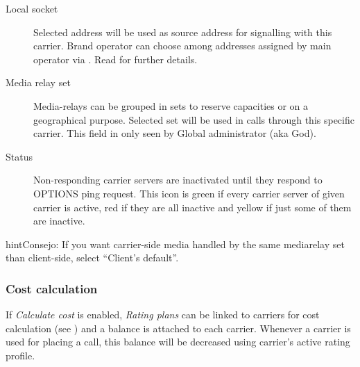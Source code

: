 \documentclass[letterpaper,10pt,spanish]{sphinxmanual}
\begin{document}
\begin{description}
\item[{Local socket}] \leavevmode{}\label{administration_portal/brand/providers/carriers:term-local-socket}
Selected address will be used as source address for signalling with this carrier. Brand operator can choose among
addresses assigned by main operator via {\hyperref[administration_portal/platform/brands:brands]{}}. Read {\hyperref[administration_portal/platform/infrastructure/proxy_trunks:proxy\string-trunks]{}} for further details.

\item[{Media relay set}] \leavevmode{}\label{administration_portal/brand/providers/carriers:term-media-relay-set}
Media-relays can be grouped in sets to reserve capacities or on a geographical purpose. Selected set will be used
in calls through this specific carrier. This field in only seen by Global administrator (aka God).

\item[{Status}] \leavevmode{}\label{administration_portal/brand/providers/carriers:term-status}
Non-responding carrier servers are inactivated until they respond to OPTIONS ping request. This icon is green if
every carrier server of given carrier is active, red if they are all inactive and yellow if just some of them are inactive.

\end{description}

\begin{notice}{hint}{Consejo:}
If you want carrier-side media handled by the same mediarelay set than client-side, select ``Client's default''.
\end{notice}


\subsubsection{Cost calculation}
\label{administration_portal/brand/providers/carriers:cost-calculation}
If \emph{Calculate cost} is enabled, \emph{Rating plans} can be linked to carriers for cost calculation (see
{\hyperref[administration_portal/brand/billing/rating_plans:assigning\string-rating\string-plans\string-to\string-carriers]{}}) and a balance is attached to each carrier. Whenever a carrier is used for
placing a call, this balance will be decreased using carrier's active rating profile.
\end{document}
